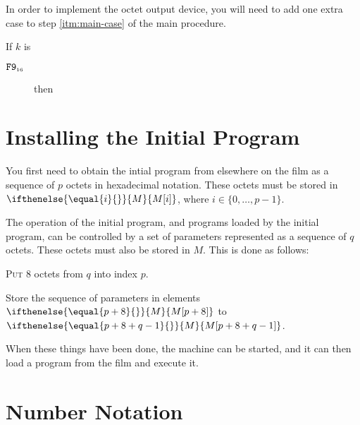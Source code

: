 \documentclass[a4paper,12pt]{article}
\newcommand{\num}[1]{\texttt{#1}}
\newcommand{\hex}[1]{\num{#1}_{\textup{\tiny 16}}}
\newcommand{\MEM}[1]{\ifthenelse{\equal{#1}{}}{M}{M[#1]}}
\newcommand{\bitno}[2]{#1.\mathrm{bit}[#2]}
\newcommand{\range}[2]{\{#1,\ldots,#2\}}
\newcommand{\proc}[1]{\textsc{#1}}
\newcommand{\deviceio}[1]{$\langle$#1$\rangle$}
\newcommand{\op}[1]{$#1$}
\theoremstyle{definition}
\newcommand{\PUTBYTE}   [1]{\op{\hex{F9}}}
\begin{document}
In order to implement the octet output device, you will need to add one extra case to step \ref{itm:main-case} of the main procedure.

\begin{stepnumbers}[start=3]
  \setcounter{enumi}{2}
\item If $k$ is
  \begin{description}
  \item[\PUTBYTE{}] then
  \end{description}
\end{stepnumbers}

\section{Installing the Initial Program}

You first need to obtain the intial program from elsewhere on the film as a sequence of $p$ octets in hexadecimal notation.
These octets must be stored in $\MEM{i}$, where $i \in \range{0}{p-1}$.

The operation of the initial program, and programs loaded by the initial program, can be controlled by a set of parameters represented as a sequence of $q$ octets.
These octets must also be stored in $M$.
This is done as follows:
\begin{stepnumbers}
  \item \proc{Put} 8 octets from $q$ into index $p$.
  \item Store the sequence of parameters in elements $\MEM{p+8}$ to $\MEM{p+8+q-1}$.
\end{stepnumbers}
When these things have been done, the machine can be started, and it can then load a program from the film and execute it.

\appendix

\section{Number Notation}
\label{sec:number-notation}
\end{document}

